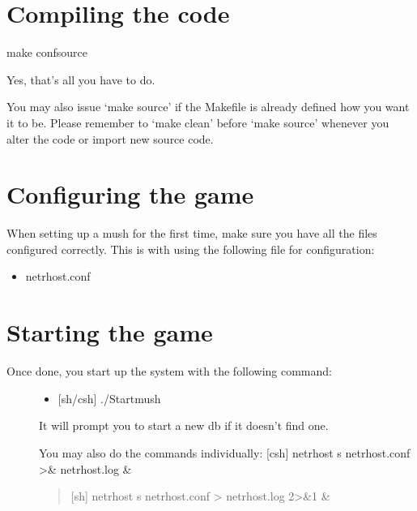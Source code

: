 \documentclass[letterpaper,10pt,english]{sphinxmanual}
\begin{document}
\section{Compiling the code}
\label{\detokenize{29-setup:compiling-the-code}}
\sphinxAtStartPar
make confsource

\sphinxAtStartPar
Yes, that’s all you have to do.

\sphinxAtStartPar
You may also issue ‘make source’ if the Makefile is already defined how
you want it to be.  Please remember to ‘make clean’ before ‘make source’
whenever you alter the code or import new source code.


\section{Configuring the game}
\label{\detokenize{29-setup:configuring-the-game}}
\sphinxAtStartPar
When setting up a mush for the first time, make sure you
have all the files configured correctly.  This is with using
the following file for configuration:
\begin{itemize}
\item {} 
\sphinxAtStartPar
netrhost.conf

\end{itemize}


\section{Starting the game}
\label{\detokenize{29-setup:starting-the-game}}\begin{description}
\item[{Once done, you start up the system with the following command:}] \leavevmode\begin{itemize}
\item {} 
\sphinxAtStartPar
{[}sh/csh{]} ./Startmush

\end{itemize}

\sphinxAtStartPar
It will prompt you to start a new db if it doesn’t find one.

\sphinxAtStartPar
You may also do the commands individually:
\sphinxhyphen{} {[}csh{]} netrhost \sphinxhyphen{}s netrhost.conf \textgreater{}\& netrhost.log \&
\begin{quote}

\sphinxAtStartPar
{[}sh{]}  netrhost \sphinxhyphen{}s netrhost.conf \textgreater{} netrhost.log 2\textgreater{}\&1 \&
\end{quote}

\end{description}
\end{document}
